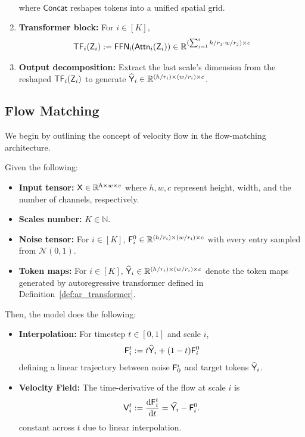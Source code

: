 \begin{definition}
\begin{enumerate}
\begin{align*}
        \end{align*}
        where $\mathsf{Concat}$ reshapes tokens into a unified spatial grid.
        \item {\bf Transformer block:} For $i \in [K]$,
        \begin{align*}
            \mathsf{TF}_i(\mathsf{Z}_i) := \mathsf{FFN_i}(\mathsf{Attn}_i(\mathsf{Z}_i)) \in \mathbb{R}^{(\sum_{j=1}^i h/r_j \cdot w/r_{j})\times c}
        \end{align*}
        \item {\bf Output decomposition:} Extract the last scale's dimension   from the reshaped $\mathsf{TF}_i(\mathsf{Z}_i)$ to generate $\widehat{\mathsf{Y}}_i \in \mathbb{R}^{(h/r_i) \times (w/r_i) \times c}$.
    \end{enumerate}
\end{definition}


\subsection{Flow Matching}\label{sec:flow_matching}
We begin by outlining the concept of velocity flow in the flow-matching architecture.
\begin{definition}[Flow]\label{def:flow}
Given the following:
\begin{itemize}
    \item {\bf Input tensor:} $\mathsf{X} \in \mathbb{R}^{h \times w \times c}$ where $h,w,c$ represent height, width, and the number of channels, respectively.
    \item {\bf Scales number:} $K \in \mathbb{N}$.
    \item {\bf Noise tensor: } For $i \in [K]$, $\mathsf{F}_i^0 \in \mathbb{R}^{(h / r_i) \times (w/r_i) \times c}$ with every entry sampled from $\mathcal{N}(0,1)$.
    \item {\bf Token maps:} For $i \in [K]$, $\widehat{\mathsf{Y}}_i \in \mathbb{R}^{(h / r_i) \times (w/r_i) \times c}$ denote the token maps generated by autoregressive transformer defined in Definition~\ref{def:ar_transformer}.
\end{itemize}
Then, the model does the following:
\begin{itemize}
    \item {\bf Interpolation:} For timestep $t \in [0,1]$ and scale $i$,
    \begin{align*}
        \mathsf{F}_i^t := t \widehat{\mathsf{Y}}_i + (1-t) \mathsf{F}_i^0
    \end{align*}
    defining a linear trajectory between noise $\mathsf{F}_0^i$ and target tokens  $\widehat{\mathsf{Y}}_i$.
    \item {\bf Velocity Field:} The time-derivative of the flow at scale $i$ is 
    \begin{align*}
        \mathsf{V}^t_i := \frac{\mathrm{d} \mathsf{F}^t_{i}}{\mathrm{d} t} = \widehat{\mathsf{Y}_i} -\mathsf{F}^0_i.
    \end{align*}
    constant across $t$ due to linear interpolation.
\end{itemize}
\end{definition}

